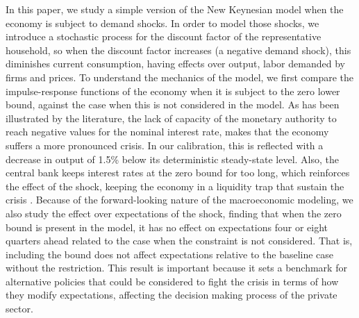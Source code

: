 \documentclass[11pt]{article}
\numberwithin{equation}{section}
\begin{document}
In this paper, we study a simple version of the New Keynesian model when the economy is subject to demand shocks. In order to model those shocks, we introduce a stochastic process for the discount factor of the representative household, so when the discount factor increases (a negative demand shock), this diminishes current consumption, having effects over output, labor demanded by firms and prices. To understand the mechanics of the model, we first compare the impulse-response functions of the economy when it is subject to the zero lower bound, against the case when this is not considered in the model. As has been illustrated by the literature, the lack of capacity of the monetary authority to reach negative values for the nominal interest rate, makes that the economy suffers a more pronounced crisis. In our calibration, this is reflected with a decrease in output of 1.5\% below its deterministic steady-state level. Also, the central bank keeps interest rates at the zero bound for too long, which reinforces the effect of the shock, keeping the economy in a liquidity trap that sustain the crisis \citep{Werning2012}. Because of the forward-looking nature of the macroeconomic modeling, we also study the effect over expectations of the shock, finding that when the zero bound is present in the model, it has no effect on expectations four or eight quarters ahead related to the case when the constraint is not considered. That is, including the bound does not affect expectations relative to the baseline case without the restriction. This result is important because it sets a benchmark for alternative policies that could be considered to fight the crisis in terms of how they modify expectations, affecting the decision making process of the private sector.
\end{document}
